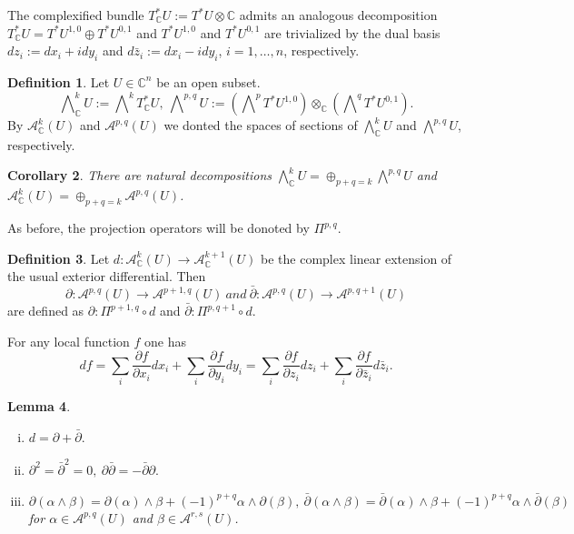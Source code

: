 \documentclass{article}
\theoremstyle{definition}
\newtheorem{definition}{Definition}[subsection]
\theoremstyle{plain}
\newtheorem{lemma}[definition]{Lemma}
\newtheorem{corollary}[definition]{Corollary}
\begin{document}
The complexified bundle $ T_{\mathbb{C}}^* U:=T^* U\otimes\mathbb{C} $ admits an analogous decomposition $ T_{\mathbb{C}}^* U=T^* U^{1,0}\oplus T^* U^{0,1} $ and $ T^* U^{1,0} $ and $ T^* U^{0,1} $ are trivialized by the dual basis $ dz_i:=dx_i+idy_i $ and $ d\bar{z}_i:=dx_i-idy_i $, $ i=1,\dots,n $, respectively.

\begin{definition}
    Let $ U\in\mathbb{C}^n $ be an open subset.\[
        \bigwedge\nolimits^{k}_{\mathbb{C}}U:=\bigwedge\nolimits^{k} T_{\mathbb{C}}^* U,\ \bigwedge\nolimits^{p,q}U:=(\bigwedge\nolimits^p T^* U^{1,0})\otimes_{\mathbb{C}}(\bigwedge\nolimits^q T^* U^{0,1}).
    \]By $ \mathcal{A}^{k}_{\mathbb{C}}(U) $ and $ \mathcal{A}^{p,q}(U) $ we donted the spaces of sections of $ \bigwedge^{k}_{\mathbb{C}}U $ and $ \bigwedge^{p,q} U $, respectively.
\end{definition}

\begin{corollary}
    There are natural decompositions $ \bigwedge^{k}_{\mathbb{C}}U=\oplus_{p+q=k}\bigwedge^{p,q}U $ and $ \mathcal{A}^{k}_{\mathbb{C}}(U)=\oplus_{p+q=k}\mathcal{A}^{p,q}(U) $.
\end{corollary}

As before, the projection operators will be donoted by $ \varPi^{p,q} $.

\begin{definition}
    Let $ d:\mathcal{A}^{k}_{\mathbb{C}}(U)\rightarrow\mathcal{A}^{k+1}_{\mathbb{C}}(U) $ be the complex linear extension of the usual exterior differential. Then\[
        \partial: \mathcal{A}^{p,q}(U)\longrightarrow\mathcal{A}^{p+1,q}(U)\ and\ \bar{\partial}:\mathcal{A}^{p,q}(U)\longrightarrow\mathcal{A}^{p,q+1}(U)
    \]are defined as $ \partial:\varPi^{p+1,q}\circ d $ and $ \bar{\partial}:\varPi^{p,q+1}\circ d $.
\end{definition}

For any local function $ f $ one has\[
    df=\sum_{i}\frac{\partial f}{\partial x_i}dx_i+\sum_{i}\frac{\partial f}{\partial y_i}dy_i=\sum_{i}\frac{\partial f}{\partial z_i}dz_i+\sum_{i}\frac{\partial f}{\partial \bar{z}_i}d\bar{z}_i.
\]

\begin{lemma}
    \begin{enumerate}[(i)]
        \item $ d=\partial+\bar{\partial}. $
        \item $ \partial^{2}=\bar{\partial}^{2}=0,\ \partial\bar{\partial}=-\bar{\partial}\partial. $
        \item \[
            \partial(\alpha\wedge\beta)=\partial(\alpha)\wedge\beta+(-1)^{p+q}\alpha\wedge\partial(\beta),\ \bar{\partial}(\alpha\wedge\beta)=\bar{\partial}(\alpha)\wedge\beta+(-1)^{p+q}\alpha\wedge\bar{\partial}(\beta)
        \]for $ \alpha\in\mathcal{A}^{p,q}(U) $ and $ \beta\in\mathcal{A}^{r,s}(U) $.
    \end{enumerate}
\end{lemma}
\end{document}

